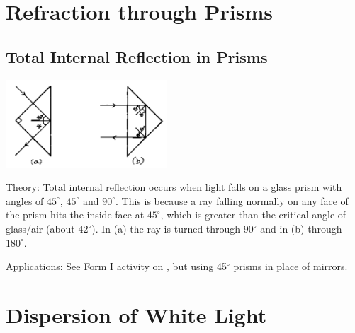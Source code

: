 \begin{multicols}{2}
\section*{Refraction through Prisms}


\subsection{Total Internal Reflection in Prisms}

\begin{center}
\includegraphics[width=0.45\textwidth]{./img/source/total-int-refl-prism.png}
\end{center}

\begin{description*}
\item[Theory:]{Total internal reflection occurs when light falls on a glass prism with angles of $45^\circ$, $45^\circ$ and $90^\circ$. This is because a ray falling normally on any face of the prism hits the inside face at $45^\circ$, which is greater than the critical angle of glass/air (about $42^\circ$). In (a) the ray is turned through $90^\circ$ and in (b) through $180^\circ$.}
\item[Applications:]{See Form I activity on , but using 45$^\circ$ prisms in place of mirrors.}
\end{description*}


\section*{Dispersion of White Light}



\end{multicols}
